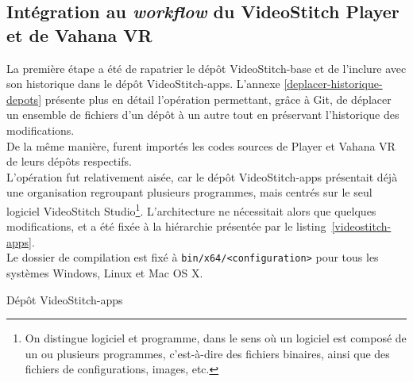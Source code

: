 \subsection{Intégration au \textit{workflow} du VideoStitch Player et de Vahana VR}
La première étape a été de rapatrier le dépôt VideoStitch-base et de l'inclure
avec son historique dans le dépôt VideoStitch-apps. L'annexe \ref{deplacer-historique-depots}
présente plus en détail l'opération permettant, grâce à Git, de déplacer un ensemble 
de fichiers d'un dépôt à un autre tout en préservant l'historique des modifications.\\
De la même manière, furent importés les codes sources de Player et Vahana VR de 
leurs dépôts respectifs.\\
L'opération fut relativement aisée, car le dépôt VideoStitch-apps présentait déjà
une organisation regroupant plusieurs programmes, mais centrés sur le seul logiciel
VideoStitch Studio\footnote{On distingue logiciel et programme, dans le sens où un logiciel
est composé de un ou plusieurs programmes, c'est-à-dire des fichiers binaires, ainsi que des
fichiers de configurations, images, etc.\cite{logiciel}}. L'architecture ne nécessitait alors que quelques modifications, et
a été fixée à la hiérarchie présentée par le listing~\ref{videostitch-apps}.\\
Le dossier de compilation est fixé à \texttt{bin/x64/<configuration>}
pour tous les systèmes Windows, Linux et Mac OS X.
\begin{listing}
  \caption{Dépôt VideoStitch-apps}
  \label{videostitch-apps}
\end{listing}

